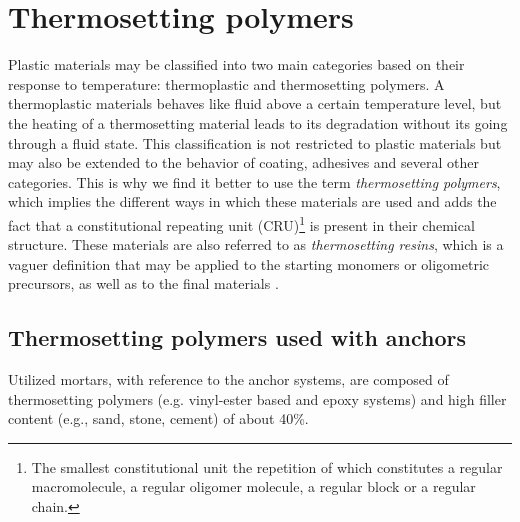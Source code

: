 \section{Thermosetting polymers}\label{sec:thermo_polymers}

Plastic materials may be classified into two main categories based on their response to temperature: thermoplastic and thermosetting polymers. A thermoplastic materials behaves like fluid above a certain temperature level, but the heating of a thermosetting material leads to its degradation without its going through a fluid state. This classification is not restricted to plastic materials but may also be extended to the behavior of coating, adhesives and several other categories. This is why we find it better to use the term \textit{thermosetting polymers}, which implies the different ways in which these materials are used and adds the fact that a constitutional repeating unit (CRU)\footnote{The smallest constitutional unit the repetition of which constitutes a regular macromolecule, a regular oligomer molecule, a regular block or a regular chain.} is present in their chemical structure. These materials are also referred to as \textit{thermosetting resins}, which is a vaguer definition that may be applied to the starting monomers or oligometric precursors, as well as to the final materials \cite{thermosetting_polymers}. 

\subsection{Thermosetting polymers used with anchors}\label{subsec:polymers_in_anchors}
Utilized mortars, with reference to the anchor systems, are composed of thermosetting polymers (e.g. vinyl-ester based and epoxy systems) and high filler content (e.g., sand, stone, cement) of about 40\%.

